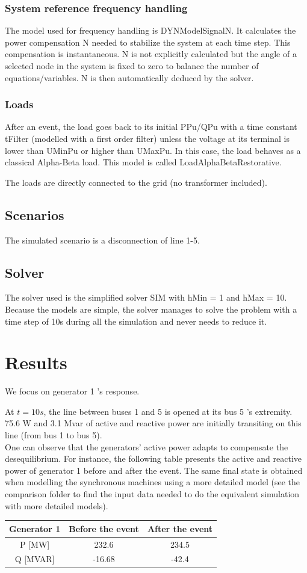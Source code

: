 \documentclass[a4paper, 12pt]{report}
\begin{document}
\subsubsection{System reference frequency handling}

The model used for frequency handling is DYNModelSignalN. It calculates the power compensation N needed to stabilize the system at each time step. This compensation is instantaneous. N is not explicitly calculated but the angle of a selected node in the system is fixed to zero to balance the number of equations/variables. N is then automatically deduced by the solver.

\subsubsection{Loads}

After an event, the load goes back to its initial PPu/QPu with a time constant tFilter (modelled with a first order filter) unless the voltage at its terminal is lower than UMinPu or higher than UMaxPu. In this case, the load behaves as a classical Alpha-Beta load. This model is called LoadAlphaBetaRestorative.

The loads are directly connected to the grid (no transformer included).


\subsection{Scenarios}
The simulated scenario is a disconnection of line 1-5.

\subsection{Solver}
The solver used is the simplified solver SIM with hMin = 1 and hMax = 10. Because the models are simple, the solver manages to solve the problem with a time step of 10s during all the simulation and never needs to reduce it.


\newpage
\section{Results}

We focus on generator 1 's response.

At $t=10s$, the line between buses 1 and 5 is opened at its bus 5 's extremity. 75.6 W and 3.1 Mvar of active and reactive power are initially transiting on this line (from bus 1 to bus 5).\\
One can observe that the generators' active power adapts to compensate the desequilibrium. For instance, the following table presents the active and reactive power of generator 1 before and after the event. The same final state is obtained when modelling the synchronous machines using a more detailed model (see the comparison folder to find the input data needed to do the equivalent simulation with more detailed models).

\begin{center}
\begin{tabular}{|c|c|c|}
  \hline
  Generator 1 & Before the event & After the event \\
  \hline
  P [MW] & 232.6 & 234.5 \\
  Q [MVAR] & -16.68 & -42.4 \\
  \hline
\end{tabular}
\end{center}
\end{document}
